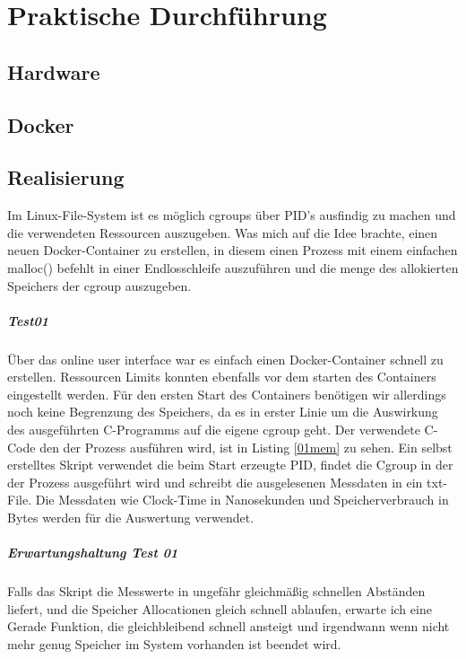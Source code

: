 \thispagestyle{empty}
\section{Praktische Durchführung}
\subsection{Hardware}
\subsection{Docker}
\subsection{Realisierung}
Im Linux-File-System ist es möglich cgroups über PID's ausfindig zu machen und die verwendeten Ressourcen auszugeben. Was mich auf die Idee brachte, einen neuen Docker-Container zu erstellen, in diesem einen Prozess mit einem einfachen malloc() befehlt in einer Endlosschleife auszuführen und die menge des allokierten Speichers der cgroup auszugeben. 

\subparagraph{Test01}
Über das online user interface war es einfach einen Docker-Container schnell zu erstellen. Ressourcen Limits konnten ebenfalls vor dem starten des Containers eingestellt werden. Für den ersten Start des Containers benötigen wir allerdings noch keine Begrenzung des Speichers, da es in erster Linie um die Auswirkung des ausgeführten C-Programms auf die eigene cgroup geht. Der verwendete C-Code den der Prozess ausführen wird, ist in Listing \ref{01mem} zu sehen. Ein selbst erstelltes Skript verwendet die beim Start erzeugte PID, findet die Cgroup in der der Prozess ausgeführt wird und schreibt die ausgelesenen Messdaten in ein txt-File. Die Messdaten wie Clock-Time in Nanosekunden und Speicherverbrauch in Bytes werden für die Auswertung verwendet.

\vspace{1em}


\subparagraph{Erwartungshaltung Test 01}
Falls das Skript die Messwerte in ungefähr gleichmäßig schnellen Abständen liefert, und die Speicher Allocationen gleich schnell ablaufen, erwarte ich eine Gerade Funktion, die gleichbleibend schnell ansteigt und irgendwann wenn nicht mehr genug Speicher im System vorhanden ist beendet wird.

